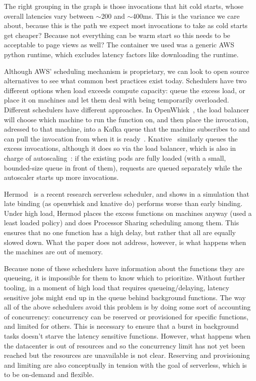 The right grouping in the graph is those invocations that hit cold starts, whose
overall latencies vary between $\sim$200 and $\sim$400ms. This is the variance
we care about, because this is the path we expect most invocations to take as
cold starts get cheaper? Because not everything can be warm start so this needs
to be acceptable to page views as well? The container we used was a generic AWS
python runtime, which excludes latency factors like downloading the runtime.

Although AWS' scheduling mechanism is proprietary, we can look to open source
alternatives to see what common best practices exist today. Schedulers have two
different options when load exceeds compute capacity: queue the excess load, or
place it on machines and let them deal with being temporarily overloaded.
Different schedulers have different approaches. In OpenWhisk~\cite{openwhisk},
the load balancer will choose which machine to run the function on, and then
place the invocation, adressed to that machine, into a Kafka queue that the
machine subscribes to and can pull the invocation from when it is
ready~\cite{openwhisk-sched}. Knative~\cite{knative} similarly queues the excess
invocations, although it does so via the load balancer, which is also in charge
of autoscaling~\cite{knative-sched}: if the existing pods are fully loaded (with
a small, bounded-size queue in front of them), requests are queued separately
while the autoscaler starts up more invocations.

Hermod~\cite{hermod} is a recent research serverless scheduler, and shows in a
simulation that late binding (as openwhisk and knative do) performs worse than
early binding. Under high load, Hermod places the excess functions on machines
anyway (used a least loaded policy) and does Processor Sharing scheduling among
them. This ensures that no one function has a high delay, but rather that all
are equally slowed down. What the paper does not address, however, is what
happens when the machines are out of memory. 

Because none of these schedulers have information about the functions they are
queueing, it is impossible for them to know which to prioritize. Without further
tooling, in a moment of high load that requires queueing/delaying, latency
sensitive jobs might end up in the queue behind background functions. The way
all of the above schedulers avoid this problem is by doing some sort of
accounting of concurrency: concurrency can be reserved or provisioned for
specific functions, and limited for others. This is necessary to ensure that a
burst in background tasks doesn't starve the latency sensitive functions.
However, what happens when the datacenter is out of resources and so the
concurrency limit has not yet been reached but the resources are unavailable is
not clear. Reserving and provisioning and limiting are also conceptually in
tension with the goal of serverless, which is to be on-demand and flexible.



